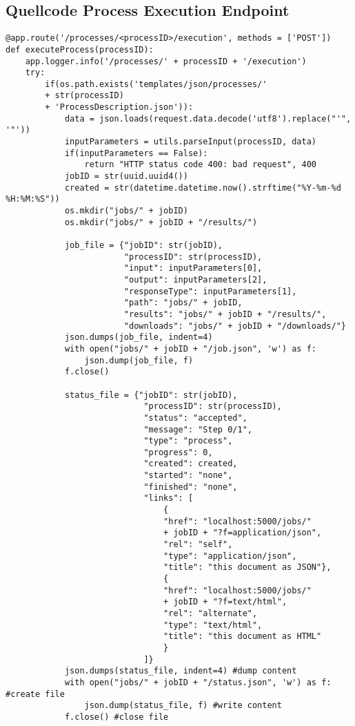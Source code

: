 \newpage
\subsection{Quellcode Process Execution Endpoint}
\begin{lstlisting}[caption={Process Execution}, style = Python]
@app.route('/processes/<processID>/execution', methods = ['POST']) 
def executeProcess(processID):
    app.logger.info('/processes/' + processID + '/execution') 
    try:
        if(os.path.exists('templates/json/processes/' 
        + str(processID) 
        + 'ProcessDescription.json')): 
            data = json.loads(request.data.decode('utf8').replace("'", '"')) 
            inputParameters = utils.parseInput(processID, data)
            if(inputParameters == False):
                return "HTTP status code 400: bad request", 400 
            jobID = str(uuid.uuid4()) 
            created = str(datetime.datetime.now().strftime("%Y-%m-%d %H:%M:%S"))
            os.mkdir("jobs/" + jobID) 
            os.mkdir("jobs/" + jobID + "/results/") 

            job_file = {"jobID": str(jobID), 
                        "processID": str(processID), 
                        "input": inputParameters[0], 
                        "output": inputParameters[2],
                        "responseType": inputParameters[1], 
                        "path": "jobs/" + jobID, 
                        "results": "jobs/" + jobID + "/results/", 
                        "downloads": "jobs/" + jobID + "/downloads/"} 
            json.dumps(job_file, indent=4) 
            with open("jobs/" + jobID + "/job.json", 'w') as f: 
                json.dump(job_file, f) 
            f.close()

            status_file = {"jobID": str(jobID), 
                            "processID": str(processID), 
                            "status": "accepted", 
                            "message": "Step 0/1", 
                            "type": "process", 
                            "progress": 0, 
                            "created": created, 
                            "started": "none", 
                            "finished": "none", 
                            "links": [ 
                                {
                                "href": "localhost:5000/jobs/" 
                                + jobID + "?f=application/json",
                                "rel": "self",
                                "type": "application/json",
                                "title": "this document as JSON"},
                                {
                                "href": "localhost:5000/jobs/" 
                                + jobID + "?f=text/html",
                                "rel": "alternate",
                                "type": "text/html",
                                "title": "this document as HTML"
                                }
                            ]}
            json.dumps(status_file, indent=4) #dump content
            with open("jobs/" + jobID + "/status.json", 'w') as f: #create file
                json.dump(status_file, f) #write content
            f.close() #close file


\end{lstlisting}
